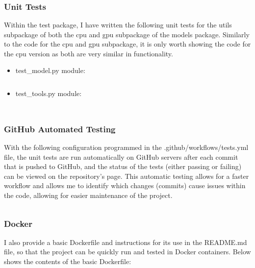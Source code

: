 \documentclass[./project-report/src/latex/project-report.tex]{subfiles}
\begin{document}
\subsubsection{Unit Tests}

Within the test package, I have written the following unit tests for the utils subpackage of both the cpu and gpu subpackage of the models package. Similarly to the code for the cpu 
and gpu subpackage, it is only worth showing the code for the cpu version as both are very similar in functionality.

\begin{itemize}
    \item test\_model.py module:
        \inputminted{python}{./school_project/test/models/cpu/utils/test_model.py}

        \pagebreak

    \item test\_tools.py module:
        \inputminted{python}{./school_project/test/models/cpu/utils/test_tools.py}
\end{itemize}

\inputminted{python}{./school_project/test/models/cpu.py}

\subsubsection{GitHub Automated Testing}

With the following configuration programmed in the .github/workflows/tests.yml file, the unit tests are run automatically on GitHub servers after each commit that is pushed to GitHub, 
and the status of the tests (either passing or failing) can be viewed on the repository's page. This automatic testing allows for a faster workflow and allows me to identify which changes 
(commits) cause issues within the code, allowing for easier maintenance of the project.

\inputminted{yaml}{./.github/workflows/tests.yml}

\subsubsection{Docker}

I also provide a basic Dockerfile and instructions for its use in the README.md file, so that the project can be quickly run and tested in Docker containers. Below 
shows the contents of the basic Dockerfile:

\inputminted{docker}{./Dockerfile}
\end{document}
